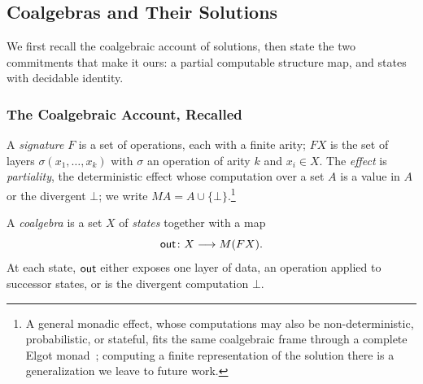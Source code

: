 \subsection{Coalgebras and Their Solutions}\label{sec:coalgebras}

We first recall the coalgebraic account of solutions, then state the two commitments that make it ours: a partial computable structure map, and states with decidable identity.

\subsubsection{The Coalgebraic Account, Recalled}

\begin{definition}\label{def:signature}
  A \emph{signature} $F$ is a set of operations, each with a finite arity; $F X$ is the set of layers $\sigma(x_1,\dots,x_k)$ with $\sigma$ an operation of arity $k$ and $x_i \in X$. The \emph{effect} is \emph{partiality}, the deterministic effect whose computation over a set $A$ is a value in $A$ or the divergent $\bot$; we write $M A = A \cup \{\bot\}$.\footnote{A general monadic effect, whose computations may also be non-deterministic, probabilistic, or stateful, fits the same coalgebraic frame through a complete Elgot monad~\cite{adamek2006-iterative-algebras, goncharov2016-complete-elgot-monads}; computing a finite representation of the solution there is a generalization we leave to future work.}
\end{definition}

\begin{definition}[Coalgebra]\label{def:coalgebra}
  A \emph{coalgebra} is a set $X$ of \emph{states} together with a map
  \[
    \mathsf{out} \colon X \longrightarrow M(F X).
  \]
  At each state, $\mathsf{out}$ either exposes one layer of data, an operation applied to successor states, or is the divergent computation $\bot$.
\end{definition}

